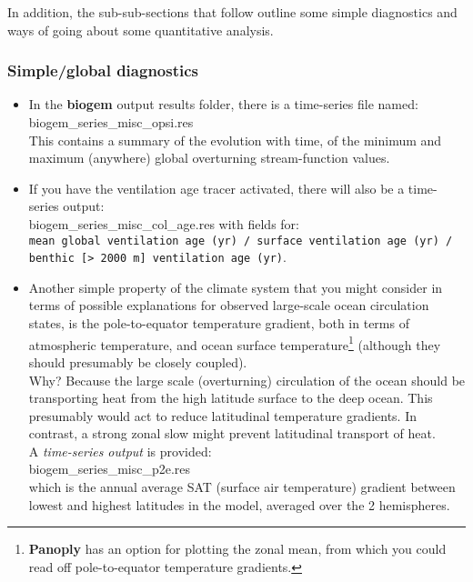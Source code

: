 \vspace{1mm}
In addition, the sub-sub-sections that follow outline some simple diagnostics and ways of going about some quantitative analysis.


\subsubsection{Simple/global diagnostics}

\vspace{1pt}
\begin{itemize}[noitemsep]
\vspace{1mm}
\item In the \textbf{biogem} output results folder, there is a time-series file named: \\\textsf{\footnotesize biogem\_series\_misc\_opsi.res} \\This contains a summary of the evolution with time, of the minimum and maximum (anywhere) global overturning stream-function values.
\vspace{1mm}
\item If you have the ventilation age tracer activated, there will also be a time-series output:  \\\textsf{\footnotesize biogem\_series\_misc\_col\_age.res} with fields for: \\\texttt{\small mean global ventilation age (yr) / surface ventilation age (yr) / benthic [> 2000 m] ventilation age (yr)}.
\vspace{1mm}
\item Another simple property of the climate system that you might consider in terms of possible explanations for observed large-scale ocean circulation states, is the pole-to-equator temperature gradient, both in terms of atmospheric temperature, and ocean surface temperature\footnote{\textbf{Panoply} has an option for plotting the zonal mean, from which you could read off pole-to-equator temperature gradients.} (although they should presumably be closely coupled).
\\Why? Because the large scale (overturning) circulation of the ocean should be transporting heat from the high latitude surface to the deep ocean. This presumably would act to reduce latitudinal temperature gradients. In contrast, a strong zonal slow might prevent latitudinal transport of heat.
\\A \textit{time-series output} is provided:  \\\textsf{\footnotesize biogem\_series\_misc\_p2e.res} \\which is the annual average SAT (surface air temperature) gradient between lowest and highest latitudes in the model, averaged over the 2 hemispheres.
\end{itemize}

